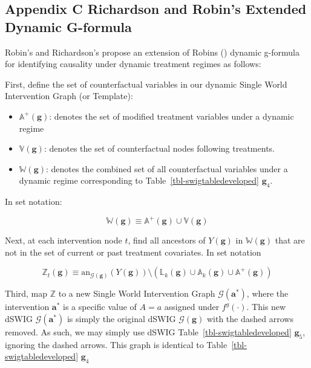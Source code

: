\documentclass[
  single column]{article}
\providecommand{\tightlist}{%
  \setlength{\itemsep}{0pt}\setlength{\parskip}{0pt}}\usepackage{longtable,booktabs,array}
\begin{document}
\newpage{}

\subsection{Appendix C Richardson and Robin's Extended Dynamic
G-formula}\label{id-app-c}

Robin's and Richardson's propose an extension of Robins
() dynamic g-formula for identifying
causality under dynamic treatment regimes as follows:

First, define the set of counterfactual variables in our dynamic Single
World Intervention Graph (or Template):

\begin{itemize}
\tightlist
\item
  \(\mathbb{A}^+(\mathbf{g})\): denotes the set of modified treatment
  variables under a dynamic regime
\item
  \(\mathbb{V}(\mathbf{g})\): denotes the set of counterfactual nodes
  following treatments.
\item
  \(\mathbb{W}(\mathbf{g})\): denotes the combined set of all
  counterfactual variables under a dynamic regime corresponding to
  Table~\ref{tbl-swigtabledeveloped} \(\mathbf{g}_4\).
\end{itemize}

In set notation:

\[
\mathbb{W}(\mathbf{g}) \equiv \mathbb{A}^+(\mathbf{g}) \cup \mathbb{V}(\mathbf{g})
\]

Next, at each intervention node \(t\), find all ancestors of
\(Y(\mathbf{g})\) in \(\mathbb{W}(\mathbf{g})\) that are not in the set
of current or past treatment covariates. In set notation

\[
\mathbb{Z}_t(\mathbf{g}) \equiv \text{an}_{\mathcal{G}(\mathbf{g})}(Y(\mathbf{g})) \setminus (\mathbb{L}_k(\mathbf{g}) \cup \mathbb{A}_k(\mathbf{g}) \cup \mathbb{A}^+(\mathbf{g}))
\]

Third, map \(\mathbb{Z}\) to a new Single World Intervention Graph
\(\mathcal{G}(\mathbf{a}^*)\), where the intervention \(\mathbf{a}^*\)
is a specific value of \(A = a\) assigned under \(f^g(\cdot)\). This new
dSWIG \(\mathcal{G}(\mathbf{a}^*)\) is simply the original dSWIG
\(\mathcal{G}(\mathbf{g})\) with the dashed arrows removed. As such, we
may simply use dSWIG Table~\ref{tbl-swigtabledeveloped}
\(\mathbf{g}_5\), ignoring the dashed arrows. This graph is identical to
Table~\ref{tbl-swigtabledeveloped} \(\mathbf{g}_4\)
\end{document}
